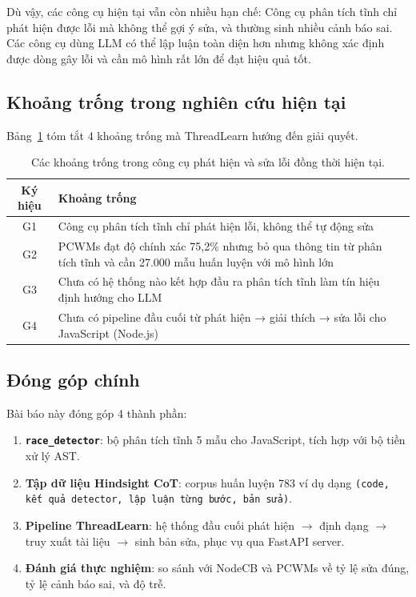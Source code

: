 \documentclass[12pt]{article}
\begin{document}
Dù vậy, các công cụ hiện tại vẫn còn nhiều hạn chế:
Công cụ phân tích tĩnh chỉ phát hiện được lỗi mà không thể gợi ý sửa, và thường
sinh nhiều cảnh báo sai.
Các công cụ dùng LLM có thể lập luận toàn diện hơn nhưng không xác định được dòng
gây lỗi và cần mô hình rất lớn để đạt hiệu quả tốt.

\subsection{Khoảng trống trong nghiên cứu hiện tại}

Bảng~\ref{tab:khoangtrong} tóm tắt 4 khoảng trống mà ThreadLearn hướng đến giải quyết.

\begin{table}[ht]
  \centering
  \caption{Các khoảng trống trong công cụ phát hiện và sửa lỗi đồng thời hiện tại.}
  \label{tab:khoangtrong}
  \begin{tabular}{@{}cp{11cm}@{}}
    \toprule
    \textbf{Ký hiệu} & \textbf{Khoảng trống} \\
    \midrule
    G1 & Công cụ phân tích tĩnh chỉ phát hiện lỗi, không thể tự động sửa \\
    G2 & PCWMs đạt độ chính xác 75,2\% nhưng bỏ qua thông tin từ phân tích tĩnh
        và cần 27.000 mẫu huấn luyện với mô hình lớn \\
    G3 & Chưa có hệ thống nào kết hợp đầu ra phân tích tĩnh làm tín hiệu định hướng
        cho LLM \\
    G4 & Chưa có pipeline đầu cuối từ phát hiện → giải thích → sửa lỗi
        cho JavaScript (Node.js) \\
    \bottomrule
  \end{tabular}
\end{table}

\subsection{Đóng góp chính}

Bài báo này đóng góp 4 thành phần:

\begin{enumerate}[leftmargin=2em]
  \item \textbf{\texttt{race\_detector}}: bộ phân tích tĩnh 5 mẫu cho JavaScript,
    tích hợp với bộ tiền xử lý AST.
  \item \textbf{Tập dữ liệu Hindsight CoT}: corpus huấn luyện 783 ví dụ dạng
    \texttt{(code, kết quả detector, lập luận từng bước, bản sửa)}.
  \item \textbf{Pipeline ThreadLearn}: hệ thống đầu cuối phát hiện $\to$ định dạng
    $\to$ truy xuất tài liệu $\to$ sinh bản sửa, phục vụ qua FastAPI server.
  \item \textbf{Đánh giá thực nghiệm}: so sánh với NodeCB và PCWMs về tỷ lệ sửa
    đúng, tỷ lệ cảnh báo sai, và độ trễ.
\end{enumerate}
\end{document}
